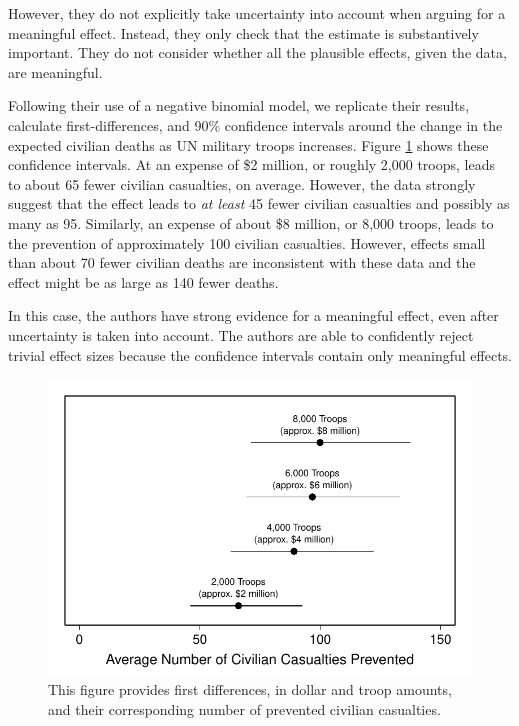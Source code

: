 \documentclass[12pt]{article}
\begin{document}
However, they do not explicitly take uncertainty into account when arguing for a meaningful effect. Instead, they only check that the estimate is substantively important. They do not consider whether all the plausible effects, given the data, are meaningful.

Following their use of a negative binomial model, we replicate their results, calculate first-differences, and 90\% confidence intervals around the change in the expected civilian deaths as UN military troops increases. Figure \ref{fig:hks-ci} shows these confidence intervals. At an expense of \$2 million, or roughly 2,000 troops, leads to about 65 fewer civilian casualties, on average. However, the data strongly suggest that the effect leads to \textit{at least} 45 fewer civilian casualties and possibly as many as 95. Similarly, an expense of about \$8 million, or 8,000 troops, leads to the prevention of approximately 100 civilian casualties. However, effects small than about 70 fewer civilian deaths are inconsistent with these data and the effect might be as large as 140 fewer deaths. 

In this case, the authors have strong evidence for a meaningful effect, even after uncertainty is taken into account. The authors are able to confidently reject trivial effect sizes because the confidence intervals contain only meaningful effects.

\begin{figure}[H]
\begin{center}
\includegraphics[scale = .8]{figs/hks-ci.pdf}
\caption{This figure provides first differences, in dollar and troop amounts, and their corresponding number of prevented civilian casualties.}\label{fig:hks-ci}
\end{center}
\end{figure}
\end{document}
